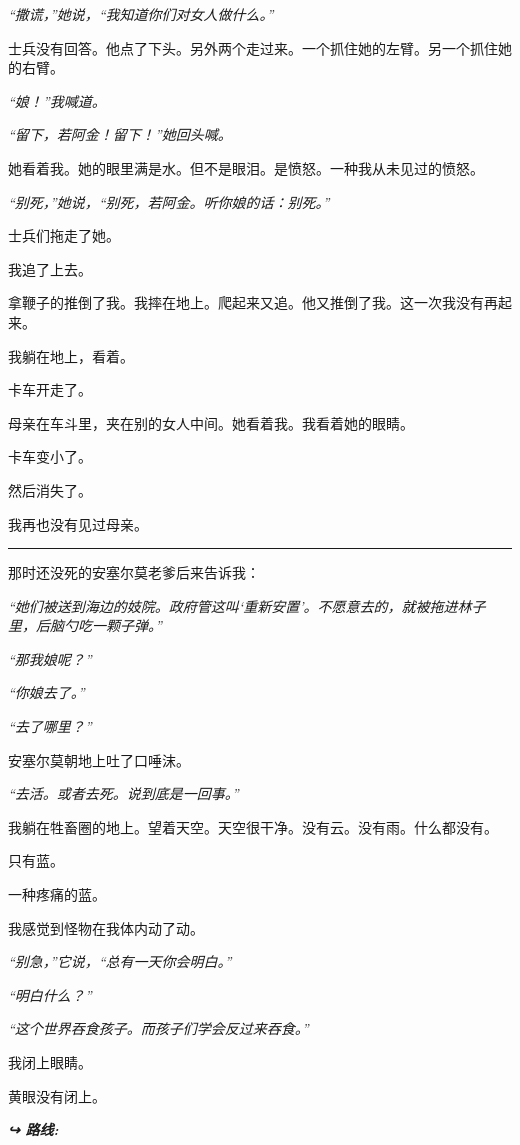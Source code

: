 \noindent \textit{“撒谎，”她说，“我知道你们对女人做什么。”}

\noindent 士兵没有回答。他点了下头。另外两个走过来。一个抓住她的左臂。另一个抓住她的右臂。

\noindent \textit{“娘！”我喊道。}

\noindent \textit{“留下，若阿金！留下！”她回头喊。}

\noindent 她看着我。她的眼里满是水。但不是眼泪。是愤怒。一种我从未见过的愤怒。

\noindent \textit{“别死，”她说，“别死，若阿金。听你娘的话：别死。”}

\noindent 士兵们拖走了她。

\noindent 我追了上去。

\noindent 拿鞭子的推倒了我。我摔在地上。爬起来又追。他又推倒了我。这一次我没有再起来。

\noindent 我躺在地上，看着。

\noindent 卡车开走了。

\noindent 母亲在车斗里，夹在别的女人中间。她看着我。我看着她的眼睛。

\noindent 卡车变小了。

\noindent 然后消失了。

\noindent 我再也没有见过母亲。

\vspace{0.5em}\noindent\rule{\textwidth}{0.5pt}\vspace{0.5em}

\noindent 那时还没死的安塞尔莫老爹后来告诉我：

\noindent \textit{“她们被送到海边的妓院。政府管这叫‘重新安置’。不愿意去的，就被拖进林子里，后脑勺吃一颗子弹。”}

\noindent \textit{“那我娘呢？”}

\noindent \textit{“你娘去了。”}

\noindent \textit{“去了哪里？”}

\noindent 安塞尔莫朝地上吐了口唾沫。

\noindent \textit{“去活。或者去死。说到底是一回事。”}

\noindent 我躺在牲畜圈的地上。望着天空。天空很干净。没有云。没有雨。什么都没有。

\noindent 只有蓝。

\noindent 一种疼痛的蓝。

\noindent 我感觉到怪物在我体内动了动。

\noindent \textit{“别急，”它说，“总有一天你会明白。”}

\noindent \textit{“明白什么？”}

\noindent \textit{“这个世界吞食孩子。而孩子们学会反过来吞食。”}

\noindent 我闭上眼睛。

\noindent 黄眼没有闭上。

\vspace{0.5em}
\noindent\textit{\textbf{↪ 路线:}  \rotasep {} \rotasep {} \rotasep {}}
